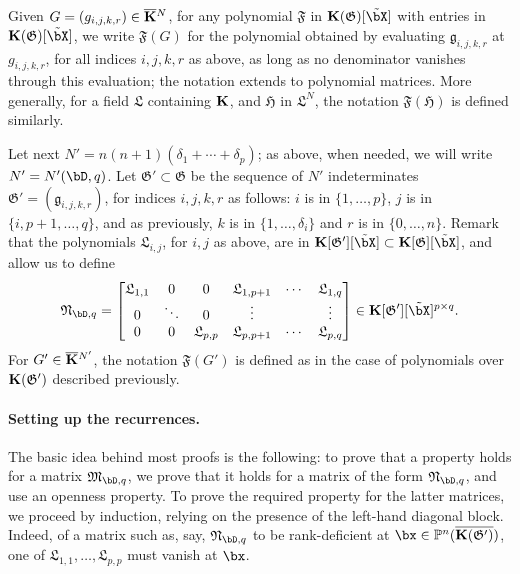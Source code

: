 \documentclass[12pt]{article}
\begin{document}
Given $G=(g_{i,j,k,r})\in \overline{\mathbf{K}}{}^N$, for any polynomial
$\mathfrak{F}$ in $\KK(\mathfrak{G})[\tilde \bX]$ with entries in
$\KK(\mathfrak{ G})[\tilde \bX]$, we write $\mathfrak{F}(G)$ for the
polynomial obtained by evaluating $\mathfrak{g}_{i,j,k,r}$ at
$g_{i,j,k,r}$, for all indices $i,j,k,r$ as above, as long as no
denominator vanishes through this evaluation; the notation extends to
polynomial matrices. More generally, for a field $\mathfrak{L}$
containing $\mathbf{K}$, and $\mathfrak{H}$ in $\mathfrak{L}^N$, the notation
$\mathfrak{F}(\mathfrak{H})$ is defined similarly.

Let next $N'=n(n+1)(\delta_1+\cdots+\delta_p)$; as above, when needed, we will
write $N'=N'(\bD,q)$. Let $\mathfrak{ G}'\subset \mathfrak{G}$ be
the sequence of $N'$ indeterminates $\mathfrak{ G}'=(\mathfrak{
  g}_{i,j,k,r})$, for indices $i,j,k,r$ as follows: $i$ is in
$\{1,\dots,p\}$, $j$ is in $\{i,p+1,\dots,q\}$, and as previously, $k$
is in $\{1,\dots,\delta_i\}$ and $r$ is in $\{0,\dots,n\}$. Remark that the
polynomials $\mathfrak{L}_{i,j}$, for $i,j$ as above, are in
$\KK[\mathfrak{G}'][\tilde\bX] \subset \KK[\mathfrak{G}][\tilde \bX]$, and allow
us to define
\begin{align}\label{eq:matMprime}
\mathfrak{N}_{\bD,q}=\left [\begin{matrix} \mathfrak{L}_{1,1} & 0 & 0
    &\mathfrak{L}_{1,p+1} & \cdots & \mathfrak{L}_{1,q}\\ 0 & \ddots &
    0 & \vdots & & \vdots\\ 0&0& \mathfrak{L}_{p,p}
    &\mathfrak{L}_{p,p+1} & \cdots & \mathfrak{L}_{p,q}
  \end{matrix}\right ]\in \KK[\mathfrak{ G}'][\tilde\bX]^{p\times q}.
\end{align}
For $G' \in \overline{\mathbf{K}}{}^{N'}$, the notation $\mathfrak{F}(G')$ is defined
as in the case of polynomials over $\mathbf{K}(\mathfrak{G}')$ described
previously.


\paragraph{Setting up the recurrences.}
The basic idea behind most proofs is the following: to prove that a
property holds for a matrix $\mathfrak{M}_{\bD,q}$, we prove that it
holds for a matrix of the form $\mathfrak{N}_{\bD,q}$, and use an
openness property. To prove the required property for the latter
matrices, we proceed by induction, relying on the presence of the
left-hand diagonal block. Indeed, of a matrix such as, say,
$\mathfrak{N}_{\bD,q}$ to be rank-deficient at $\bx \in \P^n(\KKGpbar)$,
one of $\mathfrak{L}_{1,1},\dots,\mathfrak{L}_{p,p}$ must vanish at
$\bx$.
\end{document}

